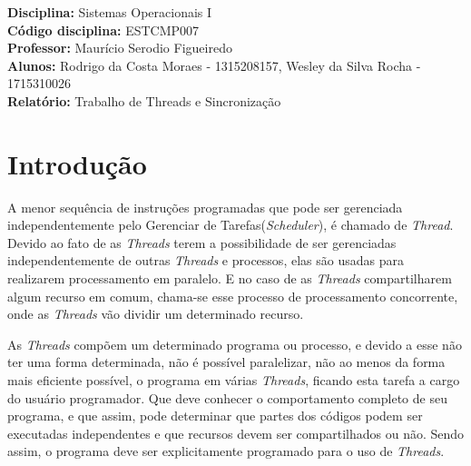 \documentclass[a4paper, 11pt]{article}
\begin{document}
\noindent
\large\textbf{Disciplina: }Sistemas Operacionais I\\
\normalsize \textbf{Código disciplina: }ESTCMP007 \\
\textbf{Professor: }Maurício Serodio Figueiredo \\
\textbf{Alunos: }Rodrigo da Costa Moraes - 1315208157, Wesley da Silva Rocha - 1715310026 \\
\textbf{Relatório: }\large Trabalho de Threads e Sincronização


\section{Introdução}
A menor sequência de instruções programadas que pode ser gerenciada independentemente pelo Gerenciar de Tarefas(\textit{Scheduler}), é chamado de \textit{Thread}. Devido ao fato de as \textit{Threads} terem a possibilidade de ser gerenciadas independentemente de outras \textit{Threads} e processos, elas são usadas para realizarem processamento em paralelo. E no caso de as \textit{Threads} compartilharem algum recurso em comum, chama-se esse processo de processamento concorrente, onde as \textit{Threads} vão dividir um determinado recurso.

As \textit{Threads} compõem um determinado programa ou processo, e devido a esse não ter uma forma determinada, não é possível paralelizar, não ao menos da forma mais eficiente possível, o programa em várias \textit{Threads}, ficando esta tarefa a cargo do usuário programador. Que deve conhecer o comportamento completo de seu programa, e que assim, pode determinar que partes dos códigos podem ser executadas independentes e que recursos devem ser compartilhados ou não. Sendo assim, o programa deve ser explicitamente programado para o uso de \textit{Threads}.
\end{document}
